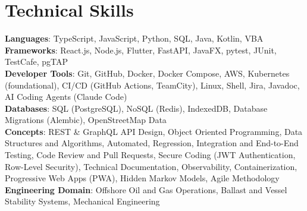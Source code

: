 \documentclass[letterpaper,11pt]{article}
\begin{document}
%
\section{Technical Skills}
 \begin{itemize}[leftmargin=0.15in, label={}]
    \small{\item{
     \textbf{Languages}{: TypeScript, JavaScript, Python, SQL, Java, Kotlin, VBA} \\
     \textbf{Frameworks}{: React.js, Node.js, Flutter, FastAPI, JavaFX, pytest, JUnit, TestCafe, pgTAP} \\
     \textbf{Developer Tools}{: Git, GitHub, Docker, Docker Compose, AWS, Kubernetes (foundational), CI/CD (GitHub Actions, TeamCity), Linux, Shell, Jira, Javadoc, AI Coding Agents (Claude Code)} \\
     \textbf{Databases}{: SQL (PostgreSQL), NoSQL (Redis), IndexedDB, Database Migrations (Alembic), OpenStreetMap Data} \\
     \textbf{Concepts}{: REST \& GraphQL API Design, Object Oriented Programming, Data Structures and Algorithms, Automated, Regression, Integration and End-to-End Testing, Code Review and Pull Requests, Secure Coding (JWT Authentication, Row-Level Security), Technical Documentation, Observability, Containerization, Progressive Web Apps (PWA), Hidden Markov Models, Agile Methodology} \\
     \textbf{Engineering Domain}{: Offshore Oil and Gas Operations, Ballast and Vessel Stability Systems, Mechanical Engineering}
    }}
 \end{itemize}


\end{document}
